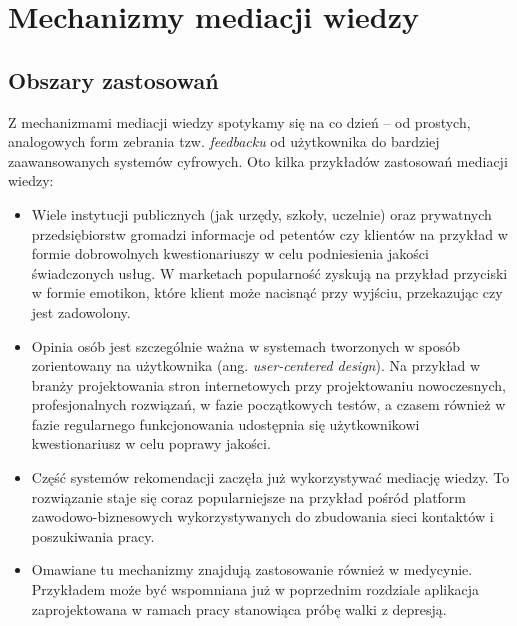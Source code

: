 \chapter{Mechanizmy mediacji wiedzy}
\label{cha:mechanizmyMediacjiWiedzy}


\section{Obszary zastosowań}
\label{sec:obszaryZastosowan}

Z mechanizmami mediacji wiedzy spotykamy się na co dzień -- od prostych, analogowych form zebrania tzw. \textit{feedbacku} od użytkownika do bardziej zaawansowanych systemów cyfrowych. Oto kilka przykładów zastosowań mediacji wiedzy:

\begin{itemize}	
	
	\item Wiele instytucji publicznych (jak urzędy, szkoły, uczelnie) oraz prywatnych przedsiębiorstw gromadzi informacje od petentów czy klientów na przykład w formie dobrowolnych kwestionariuszy w celu podniesienia jakości świadczonych usług. W marketach popularność zyskują na przykład przyciski w formie emotikon, które klient może  nacisnąć przy wyjściu, przekazując czy jest zadowolony.
	
	\item Opinia osób jest szczególnie ważna w systemach tworzonych w sposób zorientowany na użytkownika (ang. \textit{user-centered design}). Na przykład w branży projektowania stron internetowych przy projektowaniu nowoczesnych, profesjonalnych rozwiązań, w fazie początkowych testów, a czasem również w fazie regularnego funkcjonowania udostępnia się użytkownikowi kwestionariusz w celu poprawy jakości.
	
	\item Część systemów rekomendacji zaczęła już wykorzystywać mediację wiedzy. To rozwiązanie staje się coraz popularniejsze na przykład pośród platform zawodowo-biznesowych wykorzystywanych do zbudowania sieci kontaktów i poszukiwania pracy.
	
	\item Omawiane tu mechanizmy znajdują zastosowanie również w medycynie. Przykładem może być wspomniana już w poprzednim rozdziale aplikacja zaprojektowana w ramach pracy \cite{hung2016predicting} stanowiąca próbę walki z depresją.
	
\end{itemize}


